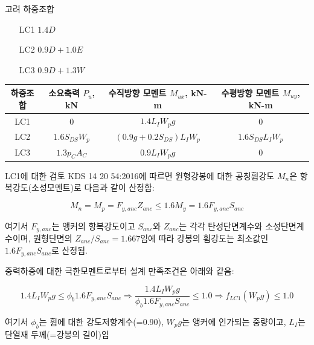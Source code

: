 \documentclass[9pt]{beamer}
\begin{document}
	\begin{frame}{고려 하중조합}
	\begin{itemize}
	\item[LC1] $1.4D$
	\item[LC2] $0.9D + 1.0E$
	\item[LC3] $0.9D + 1.3W$
\end{itemize}

\begin{table}[h]
{\small\centering
\label{tab:Demands}
\begin{tabular}{@{}cccc@{}}
\toprule
하중조합 & 소요축력 $P_u$, kN & 수직방향 모멘트 $M_{ux}$, kN-m & 수평방향 모멘트 $M_{uy}$, kN-m \\ \midrule
LC1  & 0 & $1.4L_IW_pg$ & 0 \\
LC2  & $1.6S_{DS}W_p$ & $(0.9g + 0.2S_{DS})L_IW_p$ & $1.6S_{DS}L_IW_p$ \\
LC3  & $1.3p_CA_C$   & $0.9L_IW_pg$                  & 0 \\ \bottomrule
\end{tabular}}
\end{table}
	\end{frame}
	\begin{frame}{LC1에 대한 검토}
KDS 14 20 54:2016에 따르면 원형강봉에 대한 공칭휨강도 $M_n$은 항복강도(소성모멘트)로 다음과 같이 산정함:

\begin{equation*}
	M_n = M_p = F_{y,anc} Z_{anc} \leq 1.6M_y = 1.6F_{y,anc} S_{anc}
\end{equation*}

\noindent 여기서 $F_{y,anc}$는 앵커의 항복강도이고 $S_{anc}$와 $Z_{anc}$는 각각 탄성단면계수와 소성단면계수이며, 원형단면의 $Z_{anc}/S_{anc}=1.667$임에 따라 강봉의 휨강도는 최소값인 $1.6F_{y,anc}S_{anc}$로 산정됨.
  
중력하중에 대한 극한모멘트로부터 설계 만족조건은 아래와 같음: 

\begin{equation}
	1.4L_IW_pg \leq \phi_b 1.6F_{y,anc}S_{anc} \Rightarrow \frac{1.4L_IW_pg}{\phi_b 1.6F_{y,anc}S_{anc}} \leq 1.0 \Rightarrow f_{LC1}(W_pg) \leq 1.0
	\label{eq:fLC1}
\end{equation}

\noindent 여기서 $\phi_b$는 휨에 대한 강도저항계수(=0.90), $W_pg$는 앵커에 인가되는 중량이고, $L_I$는 단열재 두께(=강봉의 길이)임 
\end{frame}
\end{document}
